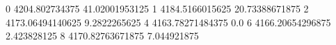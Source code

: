 0 4204.802734375 41.02001953125
1 4184.5166015625 20.73388671875
2 4173.06494140625 9.2822265625
4 4163.78271484375 0.0
6 4166.20654296875 2.423828125
8 4170.82763671875 7.044921875
